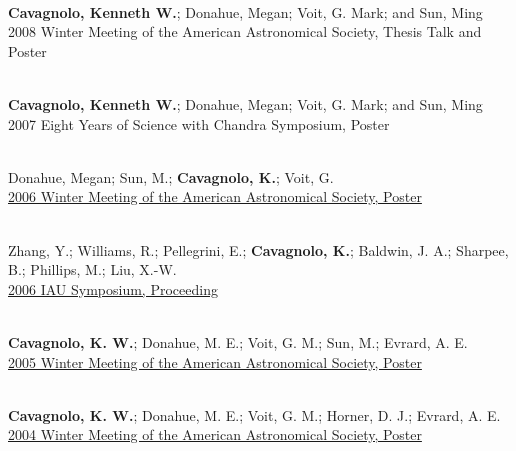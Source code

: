 \documentclass[11pt]{cv}
\begin{document}
\begin{llist}


{}\\
{\bf Cavagnolo, Kenneth W.}; Donahue, Megan; Voit, G. Mark; and Sun, Ming\\
2008 Winter Meeting of the American Astronomical Society, Thesis Talk and Poster

{}\\
{\bf Cavagnolo, Kenneth W.}; Donahue, Megan; Voit, G. Mark; and Sun, Ming\\
2007 Eight Years of Science with Chandra Symposium, Poster

{}\\
Donahue, Megan; Sun, M.; {\bf Cavagnolo, K.}; Voit, G.\\
\href{http://adsabs.harvard.edu/abs/2006AAS...209.7711D}{2006 Winter
Meeting of the American Astronomical Society, Poster}

{}\\
Zhang, Y.; Williams, R.; Pellegrini, E.; {\bf Cavagnolo, K.}; Baldwin,
J. A.; Sharpee, B.; Phillips, M.; Liu, X.-W.\\
\href{http://adsabs.harvard.edu/abs/2006IAUS..234..549Z}{2006 IAU
Symposium, Proceeding}

{}\\
{\bf Cavagnolo, K. W.}; Donahue, M. E.; Voit, G. M.; Sun, M.; Evrard, A. E.\\
\href{http://adsabs.harvard.edu/abs/2005AAS...20713903C}{2005 Winter
Meeting of the American Astronomical Society, Poster}

{}\\
{\bf Cavagnolo, K. W.}; Donahue, M. E.; Voit, G. M.; Horner, D. J.; Evrard, A. E.\\
\href{http://adsabs.harvard.edu/abs/2004AAS...20514715C}{2004 Winter
Meeting of the American Astronomical Society, Poster}


\end{llist}
\end{document}
